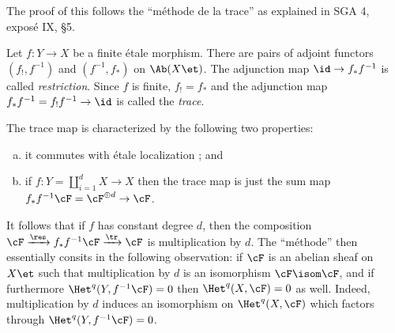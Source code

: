 
The proof of this follows the ``m\'ethode de la trace'' as explained in SGA 4, expos\'e IX, \S5. 
\begin{defi}
Let $f : Y \to X$ be a finite \'etale morphism. There are pairs of adjoint functors $(f_!,f^{-1})$ and $(f^{-1},f_*)$ on $\Ab(X\et)$. The adjunction map $\id \to f_* f^{-1}$ is called \emph{restriction}. Since $f$ is finite, $f_! = f_*$ and the adjunction map $f_* f^{-1} = f_! f^{-1} \to \id$ is called the \emph{trace}.  
\end{defi}

The trace map is characterized by the following two properties:
\begin{enumerate}[(a)]
\item
it commutes with \'etale localization ; and
\item
if $f: Y = \coprod_{i=1}^d X \to X$ then the trace map is just the sum map $f_* f^{-1} \cF = \cF^{\oplus d} \to \cF$.
\end{enumerate}

It follows that if $f$ has constant degree $d$, then the composition $\cF \xrightarrow{\res} f_* f^{-1} \cF \xrightarrow{\tr} \cF$ is multiplication by $d$. The ``m\'ethode'' then essentially consits in the following observation: if $\cF$ is an abelian sheaf on $X\et$ such that multiplication by $d$ is an isomorphism $\cF \isom \cF$, and if furthermore $\Het^q(Y,f^{-1}\cF) = 0$ then $\Het^q(X,\cF) = 0$ as well. Indeed, multiplication by $d$ induces an isomorphism on $\Het^q(X, \cF)$ which factors through $\Het^q(Y,f^{-1}\cF)= 0$.

